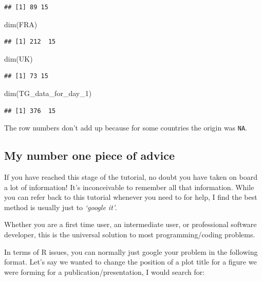 \documentclass[
]{book}
\newenvironment{Shaded}{\begin{snugshade}}{\end{snugshade}}
\newcommand{\FunctionTok}[1]{\textcolor[rgb]{0.00,0.00,0.00}{#1}}
\newcommand{\NormalTok}[1]{#1}
\begin{document}
\begin{verbatim}
## [1] 89 15
\end{verbatim}

\begin{Shaded}
\begin{Highlighting}[]
\FunctionTok{dim}\NormalTok{(FRA)}
\end{Highlighting}
\end{Shaded}

\begin{verbatim}
## [1] 212  15
\end{verbatim}

\begin{Shaded}
\begin{Highlighting}[]
\FunctionTok{dim}\NormalTok{(UK)}
\end{Highlighting}
\end{Shaded}

\begin{verbatim}
## [1] 73 15
\end{verbatim}

\begin{Shaded}
\begin{Highlighting}[]
\FunctionTok{dim}\NormalTok{(TG\_data\_for\_day\_1)}
\end{Highlighting}
\end{Shaded}

\begin{verbatim}
## [1] 376  15
\end{verbatim}

The row numbers don't add up because for some countries the origin was \texttt{NA}.

\hypertarget{my-number-one-piece-of-advice}{%
\subsection{My number one piece of advice}\label{my-number-one-piece-of-advice}}

If you have reached this stage of the tutorial, no doubt you have taken on board a lot of information! It's inconceivable to remember all that information. While you can refer back to this tutorial whenever you need to for help, I find the best method is usually just to \emph{`google it'}.

Whether you are a first time user, an intermediate user, or professional software developer, this is the universal solution to most programming/coding problems.

In terms of R issues, you can normally just google your problem in the following format. Let's say we wanted to change the position of a plot title for a figure we were forming for a publication/presentation, I would search for:
\end{document}
